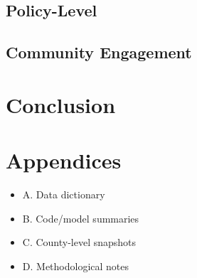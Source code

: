 \documentclass[12pt]{article}
\begin{document}
\subsection{Policy-Level}

\subsection{Community Engagement}


\section{Conclusion}


\section{Appendices}
\begin{itemize}
  \item A. Data dictionary
  \item B. Code/model summaries
  \item C. County-level snapshots
  \item D. Methodological notes
\end{itemize}
\end{document}
